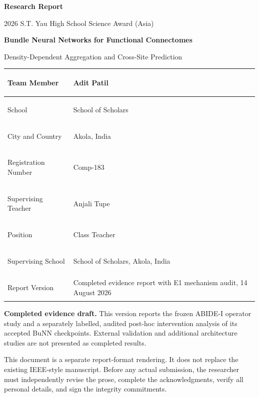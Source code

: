 \documentclass[11pt,a4paper]{article}
\newcommand{\draftnote}{\textbf{Completed evidence draft.} This version reports the frozen ABIDE-I operator study and a separately labelled, audited post-hoc intervention analysis of its accepted BuNN checkpoints. External validation and additional architecture studies are not presented as completed results.}
\begin{document}
\hypersetup{pageanchor=false}

\thispagestyle{empty}
\begin{center}
  {\Large\bfseries Research Report}\par
  \vspace{0.35em}
  {\large 2026 S.T. Yau High School Science Award (Asia)}\par
  \vspace{2.0cm}
  {\LARGE\bfseries Bundle Neural Networks for Functional Connectomes}\par
  \vspace{0.35em}
  {\Large Density-Dependent Aggregation and Cross-Site Prediction}\par
  \vspace{1.2cm}
\end{center}

\renewcommand{\arraystretch}{1.35}
\noindent\begin{tabularx}{\textwidth}{|>{\bfseries\raggedright\arraybackslash}p{3.6cm}|Y|}
\hline
Team Member & Adit Patil \\
\hline
School & School of Scholars \\
\hline
City and Country & Akola, India \\
\hline
Registration Number & Comp-183 \\
\hline
Supervising Teacher & Anjali Tupe \\
\hline
Position & Class Teacher \\
\hline
Supervising School & School of Scholars, Akola, India \\
\hline
Report Version & Completed evidence report with E1 mechanism audit, 14 August 2026 \\
\hline
\end{tabularx}

\vfill
\noindent\begin{minipage}{\textwidth}
\small\color{muted}
\draftnote

This document is a separate report-format rendering. It does not replace the
existing IEEE-style manuscript. Before any actual submission, the researcher
must independently revise the prose, complete the acknowledgments,
verify all personal details, and sign the integrity commitments.
\end{minipage}
\clearpage

\hypersetup{pageanchor=true}
\setcounter{page}{1}
\end{document}
